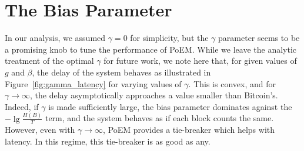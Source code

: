 \section{The Bias Parameter}

In our analysis, we assumed $\gamma = 0$ for simplicity, but the $\gamma$ parameter
seems to be a promising knob to tune the performance of PoEM. While we leave the
analytic treatment of the optimal $\gamma$ for future work, we note here that,
for given values of $g$ and $\beta$, the delay of the system behaves as illustrated
in Figure~\ref{fig:gamma_latency} for varying values of $\gamma$. This is convex, and for $\gamma \to \infty$,
the delay asymptotically approaches a value smaller than Bitcoin's. Indeed, if $\gamma$ is made sufficiently large, the bias
parameter dominates against the $-\lg\frac{H(B)}{T}$ term, and the system behaves
as if each block counts the same. However, even with $\gamma \to \infty$, PoEM provides a tie-breaker
which helps with latency. In this regime, this tie-breaker is as good as any.

